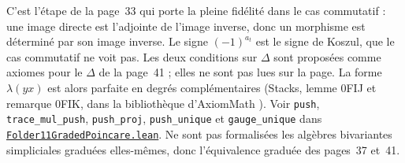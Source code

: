 \noindent C'est l'étape de la page~33 qui porte la pleine fidélité dans le cas commutatif : une image directe est l'adjointe de l'image inverse, donc un morphisme est déterminé par son image inverse. Le signe $(-1)^{a_t}$ est le signe de Koszul, que le cas commutatif ne voit pas. Les deux conditions sur $\Delta$ sont proposées comme axiomes pour le $\Delta$ de la page~41 ; elles ne sont pas lues sur la page. La forme $\lambda(yx)$ est alors parfaite en degrés complémentaires (Stacks, lemme 0FIJ et remarque 0FIK, dans la bibliothèque d'AxiomMath \cite{axiomstacks}). Voir \texttt{push}, \texttt{trace\_mul\_push}, \texttt{push\_proj}, \texttt{push\_unique} et \texttt{gauge\_unique} dans \href{\leanblobmain/AlgebraicGeometry/Folder11GradedPoincare.lean}{\texttt{Folder11GradedPoincare.\allowbreak{}lean}}. Ne sont pas formalisées les algèbres bivariantes simpliciales graduées elles-mêmes, donc l'équivalence graduée des pages~37 et~41.
